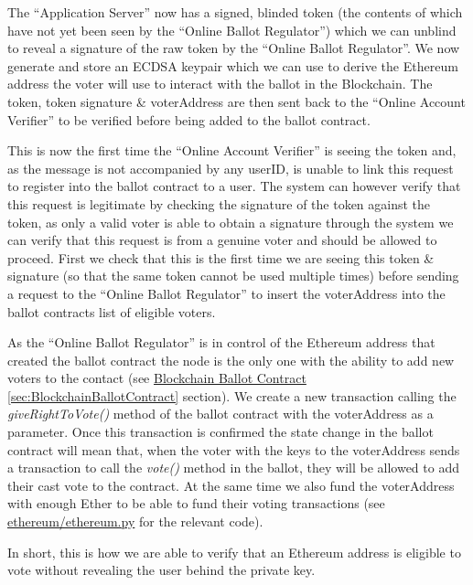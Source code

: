 \documentclass{article}
\begin{document}
The ``Application Server'' now has a signed, blinded token (the contents of which have not yet been seen by the ``Online Ballot Regulator'') which we can unblind to reveal a signature of the raw token by the ``Online Ballot Regulator''. We now generate and store an ECDSA keypair \citep{67_kobel_2017} which we can use to derive the Ethereum address the voter will use to interact with the ballot in the Blockchain. The token, token signature \& voterAddress are then sent back to the ``Online Account Verifier'' to be verified before being added to the ballot contract.

This is now the first time the ``Online Account Verifier'' is seeing the token and, as the message is not accompanied by any userID, is unable to link this request to register into the ballot contract to a user. The system can however verify that this request is legitimate by checking the signature of the token against the token, as only a valid voter is able to obtain a signature through the system we can verify that this request is from a genuine voter and should be allowed to proceed. First we check that this is the first time we are seeing this token \& signature (so that the same token cannot be used multiple times) before sending a request to the ``Online Ballot Regulator'' to insert the voterAddress into the ballot contracts list of eligible voters.

As the ``Online Ballot Regulator'' is in control of the Ethereum address that created the ballot contract the node is the only one with the ability to add new voters to the contact (see \hyperref[sec:BlockchainBallotContract]{Blockchain Ballot Contract \ref*{sec:BlockchainBallotContract}} section). We create a new transaction calling the \textit{giveRightToVote()} method of the ballot contract with the voterAddress as a parameter. Once this transaction is confirmed the state change in the ballot contract will mean that, when the voter with the keys to the voterAddress sends a transaction to call the \textit{vote()} method in the ballot, they will be allowed to add their cast vote to the contract. At the same time we also fund the voterAddress with enough Ether to be able to fund their voting transactions (see \href{https://github.com/Mattie432/Blockchain-Voting-System/blob/master/Programming/4_OnlineBallotRegulator/ethereum/ethereum.py#L145}{ethereum/ethereum.py} for the relevant code).

In short, this is how we are able to verify that an Ethereum address is eligible to vote without revealing the user behind the private key.
\end{document}
